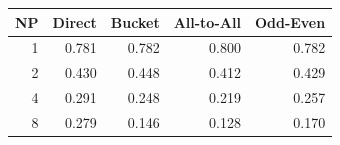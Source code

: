 \begin{tabular}{rrrrr}
  \toprule
  NP & Direct & Bucket & All-to-All & Odd-Even \\
  \midrule
  1 & 0.781 & 0.782 & 0.800 & 0.782 \\
  2 & 0.430 & 0.448 & 0.412 & 0.429 \\
  4 & 0.291 & 0.248 & 0.219 & 0.257 \\
  8 & 0.279 & 0.146 & 0.128 & 0.170 \\
  \bottomrule
\end{tabular}
